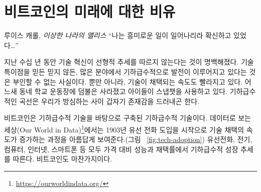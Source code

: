 \chapter{비트코인의 미래에 대한 비유}
\label{les:21}

\begin{chapquote}{루이스 캐롤, \textit{이상한 나라의 앨리스}}
	\enquote{나는 흥미로운 일이 일어나리라 확신하고 있었다\ldots}
\end{chapquote}

\begin{comment}
	In the last couple of decades, it became apparent that technological
	innovation does not follow a linear trend. Whether you believe in the
	technological singularity or not, it is undeniable that progress is
	exponential in many fields. Not only that, but the rate at which
	technologies are being adopted is accelerating, and before you know it
	the bush in the local schoolyard is gone and your kids are using
	Snapchat instead. Exponential curves have the tendency to slap you in
	the face way before you see them coming.
\end{comment}
지난 수십 년 동안 기술 혁신이 선형적 추세를 따르지 않는다는 것이 명백해졌다.
기술 특이점을 믿든 믿지 않든, 많은 분야에서 기하급수적으로 발전이 이루어지고 있다는 것은 부인할 수 없는 사실이다.
뿐만 아니라, 기술이 채택되는 속도도 빨라지고 있다. 
어느새 동네 학교 운동장에 덤불은 사라졌고 아이들이 스냅챗을 사용하고 있다.
기하급수적인 곡선은 우리가 방심하는 사이 갑자기 존재감을 드러내곤 한다.

\begin{comment}
	Bitcoin is an exponential technology built upon exponential technologies.
	\textit{Our World in Data}\footnote{\url{https://ourworldindata.org/}}
	beautifully shows the rising speed of technological adoption, starting in 1903
	with the introduction of landlines (see Figure~\ref{fig:tech-adoption}).
	Landlines, electricity, computers, the internet, smartphones; all follow
	exponential trends in price-performance and adoption. Bitcoin does
	too~\cite{tech-adoption}.
\end{comment}
비트코인은 기하급수적 기술을 바탕으로 구축된 기하급수적 기술이다.
데이터로 보는 세상(Our World in Data)\footnote{\url{https://ourworldindata.org/}}에서는
1903년 유선 전화 도입을 시작으로 기술 채택의 속도가 증가하는 과정을 아름답게 보여준다.(그림 ~\ref{fig:tech-adoption})
유선전화, 전기, 컴퓨터, 인터넷, 스마트폰 등 모두 가격 대비 성능과 채택률에서 기하급수적 성장 추세를 따른다. 
비트코인도 마찬가지이다.~\cite{tech-adoption}

